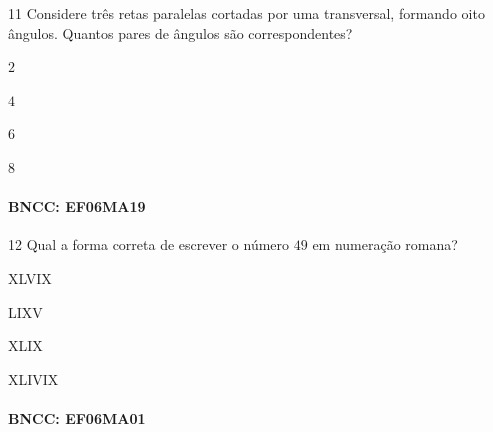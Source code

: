 \num{11} Considere três retas paralelas cortadas por uma transversal,
formando oito ângulos. Quantos pares de ângulos são correspondentes?

\begin{escolha}
\item $2$
\item $4$
\item $6$
\item $8$
\end{escolha}

\paragraph{BNCC: EF06MA19}


\num{12} Qual a forma correta de escrever o número $49$ em numeração romana?

\begin{escolha}
\item XLVIX
\item LIXV
\item XLIX
\item XLIVIX
\end{escolha}

\paragraph{BNCC: EF06MA01 }

